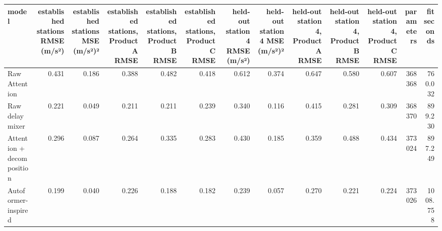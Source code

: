 \begin{tabular}{lrrrrrrrrrrrr}
\toprule
model & established stations RMSE (m/s²) & established stations MSE (m/s²)² & established stations, Product A RMSE & established stations, Product B RMSE & established stations, Product C RMSE & held-out station 4 RMSE (m/s²) & held-out station 4 MSE (m/s²)² & held-out station 4, Product A RMSE & held-out station 4, Product B RMSE & held-out station 4, Product C RMSE & parameters & fit seconds \\
\midrule
Raw Attention & 0.431 & 0.186 & 0.388 & 0.482 & 0.418 & 0.612 & 0.374 & 0.647 & 0.580 & 0.607 & 368368 & 760.032 \\
Raw delay mixer & 0.221 & 0.049 & 0.211 & 0.211 & 0.239 & 0.340 & 0.116 & 0.415 & 0.281 & 0.309 & 368370 & 899.230 \\
Attention + decomposition & 0.296 & 0.087 & 0.264 & 0.335 & 0.283 & 0.430 & 0.185 & 0.359 & 0.488 & 0.434 & 373024 & 897.249 \\
Autoformer-inspired & 0.199 & 0.040 & 0.226 & 0.188 & 0.182 & 0.239 & 0.057 & 0.270 & 0.221 & 0.224 & 373026 & 1008.758 \\
\bottomrule
\end{tabular}

